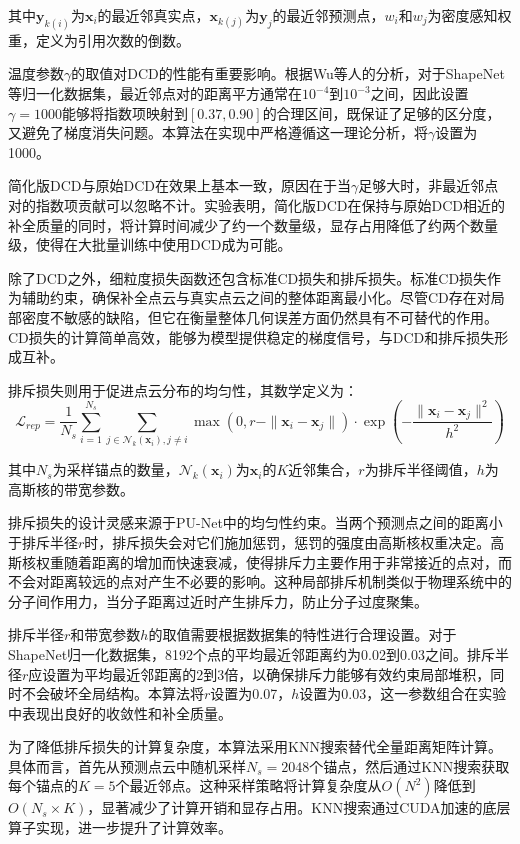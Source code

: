 其中$\mathbf{y}_{k(i)}$为$\mathbf{x}_i$的最近邻真实点，$\mathbf{x}_{k(j)}$为$\mathbf{y}_j$的最近邻预测点，$w_i$和$w_j$为密度感知权重，定义为引用次数的倒数。

温度参数$\gamma$的取值对DCD的性能有重要影响。根据Wu等人\cite{wu2021densityaware}的分析，对于ShapeNet等归一化数据集，最近邻点对的距离平方通常在$10^{-4}$到$10^{-3}$之间，因此设置$\gamma=1000$能够将指数项映射到$[0.37, 0.90]$的合理区间，既保证了足够的区分度，又避免了梯度消失问题。本算法在实现中严格遵循这一理论分析，将$\gamma$设置为1000。

简化版DCD与原始DCD在效果上基本一致，原因在于当$\gamma$足够大时，非最近邻点对的指数项贡献可以忽略不计。实验表明，简化版DCD在保持与原始DCD相近的补全质量的同时，将计算时间减少了约一个数量级，显存占用降低了约两个数量级，使得在大批量训练中使用DCD成为可能。

除了DCD之外，细粒度损失函数还包含标准CD损失和排斥损失。标准CD损失作为辅助约束，确保补全点云与真实点云之间的整体距离最小化。尽管CD存在对局部密度不敏感的缺陷，但它在衡量整体几何误差方面仍然具有不可替代的作用。CD损失的计算简单高效，能够为模型提供稳定的梯度信号，与DCD和排斥损失形成互补。

排斥损失则用于促进点云分布的均匀性，其数学定义为：
\begin{equation}
\mathcal{L}_{rep} = \frac{1}{N_s}\sum_{i=1}^{N_s}\sum_{j \in \mathcal{N}_k(\mathbf{x}_i), j \neq i} \max(0, r - \|\mathbf{x}_i - \mathbf{x}_j\|) \cdot \exp\left(-\frac{\|\mathbf{x}_i - \mathbf{x}_j\|^2}{h^2}\right)
\end{equation}

其中$N_s$为采样锚点的数量，$\mathcal{N}_k(\mathbf{x}_i)$为$\mathbf{x}_i$的$K$近邻集合，$r$为排斥半径阈值，$h$为高斯核的带宽参数。

排斥损失的设计灵感来源于PU-Net\cite{yu2018punet}中的均匀性约束。当两个预测点之间的距离小于排斥半径$r$时，排斥损失会对它们施加惩罚，惩罚的强度由高斯核权重决定。高斯核权重随着距离的增加而快速衰减，使得排斥力主要作用于非常接近的点对，而不会对距离较远的点对产生不必要的影响。这种局部排斥机制类似于物理系统中的分子间作用力，当分子距离过近时产生排斥力，防止分子过度聚集。

排斥半径$r$和带宽参数$h$的取值需要根据数据集的特性进行合理设置。对于ShapeNet归一化数据集，8192个点的平均最近邻距离约为0.02到0.03之间。排斥半径$r$应设置为平均最近邻距离的2到3倍，以确保排斥力能够有效约束局部堆积，同时不会破坏全局结构。本算法将$r$设置为0.07，$h$设置为0.03，这一参数组合在实验中表现出良好的收敛性和补全质量。

为了降低排斥损失的计算复杂度，本算法采用KNN搜索替代全量距离矩阵计算。具体而言，首先从预测点云中随机采样$N_s=2048$个锚点，然后通过KNN搜索获取每个锚点的$K=5$个最近邻点。这种采样策略将计算复杂度从$O(N^2)$降低到$O(N_s \times K)$，显著减少了计算开销和显存占用。KNN搜索通过CUDA加速的底层算子实现，进一步提升了计算效率。

